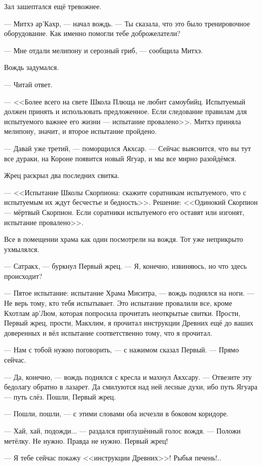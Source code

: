Зал зашептался ещё тревожнее.

--- Митхэ ар'Кахр, --- начал вождь.
--- Ты сказала, что это было тренировочное оборудование.
Как именно помогли тебе доброжелатели?

--- Мне отдали мелипону и серозный гриб, --- сообщила Митхэ.

Вождь задумался.

--- Читай ответ.

--- <<Более всего на свете Школа Плюща не любит самоубийц.
Испытуемый должен принять и использовать предложенное.
Если следование правилам для испытуемого важнее его жизни --- испытание провалено>>.
Митхэ приняла мелипону, значит, и второе испытание пройдено.

--- Давай уже третий, --- поморщился Акхсар.
--- Сейчас выяснится, что вы тут все дураки, на Короне появится новый Ягуар, и мы все мирно разойдёмся.

Жрец раскрыл два последних свитка.

--- <<Испытание Школы Скорпиона: скажите соратникам испытуемого, что с испытуемым их ждут бесчестье и бедность>>.
Решение:
<<Одинокий Скорпион --- мёртвый Скорпион.
Если соратники испытуемого его оставят или изгонят, испытание провалено>>.

Все в помещении храма как один посмотрели на вождя.
Тот уже неприкрыто ухмылялся.

--- Сатракх, --- буркнул Первый жрец.
--- Я, конечно, извиняюсь, но что здесь происходит?

--- Пятое испытание: испытание Храма Миситра, --- вождь поднялся на ноги.
--- Не верь тому, кто тебя испытывает.
Это испытание провалили все, кроме Кхотлам ар'Люм, которая попросила прочитать неоткрытые свитки.
Прости, Первый жрец, прости, Макхлим, я прочитал инструкции Древних ещё до ваших доверенных и вёл испытание соответственно тому, что я прочитал.

--- Нам с тобой нужно поговорить, --- с нажимом сказал Первый.
--- Прямо сейчас.

--- Да, конечно, --- вождь поднялся с кресла и махнул Акхсару.
--- Отвезите эту бедолагу обратно в лазарет.
Да смилуются над ней лесные духи, ибо путь Ягуара --- путь слёз.
Пошли, Первый жрец.

--- Пошли, пошли, --- с этими словами оба исчезли в боковом коридоре.

--- Хай, хай, подожди... --- раздался приглушённый голос вождя.
--- Положи метёлку.
Не нужно.
Правда не нужно.
Первый жрец!

--- Я тебе сейчас покажу <<инструкции Древних>>!
Рыбья печень!..

